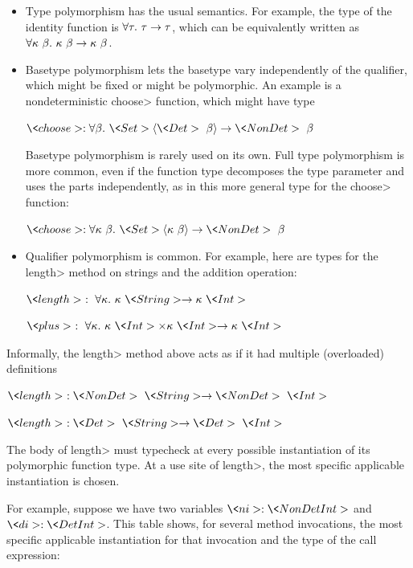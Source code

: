 \begin{itemize}
\item
Type polymorphism has the usual semantics.  For example, the type of the
identity function is $\forall \tau . \  \tau \rightarrow \tau$, which can be
equivalently written as
$\forall \kappa \ \beta . \  \kappa \ \beta \rightarrow \kappa \ \beta$.


\item
  Basetype polymorphism lets the basetype vary independently of the
  qualifier, which might be fixed or might be polymorphic.
  An example is a nondeterministic \<choose> function, which might have type

  $\<choose> : \forallt{\beta} \<Set>\angles{\<Det>\ \beta} \rightarrow \<NonDet>\ \beta$

  Basetype polymorphism is rarely used on its own.  Full type polymorphism is more
  common, even if the function type decomposes the type parameter and uses the parts independently,
  as in this more general type for the \<choose> function:

  $\<choose> : \forallt{\kappa\ \beta} \<Set>\angles{\kappa\ \beta} \rightarrow \<NonDet>\ \beta$

\item
Qualifier polymorphism is common.  For example, here are types for
the \<length> method on strings and the addition operation:

$\<length>\ :\ \forallt{\kappa} \kappa\ \<String> \rightarrow \kappa\ \<Int>$

$\<plus>\ :\ \forallt{\kappa} \kappa\ \<Int> \times \kappa\ \<Int> \rightarrow \kappa\ \<Int>$

\end{itemize}

Informally, the \<length> method above acts as if it had multiple
(overloaded) definitions

$\<length>\ : \<NonDet>\ \<String> \rightarrow \<NonDet> \ \<Int>$

$\<length>\ :\<Det>\ \<String> \rightarrow \<Det> \  \<Int>$

\noindent
The body of \<length> must typecheck at every possible instantiation of its
polymorphic function type.  At a use site of \<length>,
the most specific applicable instantiation is chosen.

For example,
suppose we have two variables $\<ni> : \<NonDet Int>$ and $\<di> : \<Det Int>$.
This table shows, for several method invocations, the 
most specific applicable instantiation for that invocation and the type of
the call expression:

